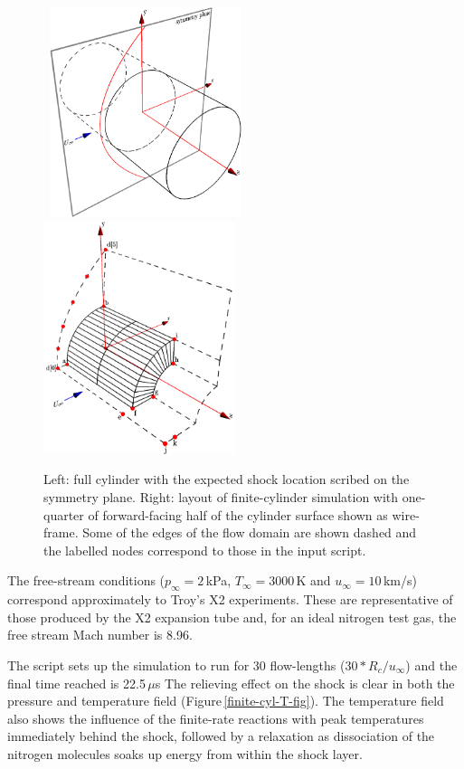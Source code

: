 \begin{figure}[htbp]
\hbox{
  \includegraphics[width=0.5\textwidth]{../3D/finite-cylinder/full-cyl-schematic.pdf}
  \includegraphics[width=0.5\textwidth]{../3D/finite-cylinder/cyl-schematic.pdf}
}
\caption{Left: full cylinder with the expected shock location scribed on the symmetry plane.
   Right: layout of finite-cylinder simulation with one-quarter of forward-facing half 
   of the cylinder surface shown as wire-frame.
   Some of the edges of the flow domain are shown dashed and
   the labelled nodes correspond to those in the input script.}
\label{finite-cyl-layout}
\end{figure}

\medskip 
The free-stream conditions ($p_{\infty} = 2$\,kPa, $T_{\infty} = 3000$\,K
and $u_{\infty} = 10$\,km/s) correspond approximately to Troy's X2 experiments.
These are representative of those produced by the X2 expansion tube and,
for an ideal nitrogen test gas, the free stream Mach number is 8.96.

\medskip
The script sets up the simulation to run for 30 flow-lengths ($30 * R_c / u_{\infty}$)
and the final time reached is 22.5\,$\mu$s
The relieving effect on the shock is clear in both the pressure and temperature field (Figure\,\ref{finite-cyl-T-fig}).
The temperature field also shows the influence of the finite-rate reactions with peak temperatures immediately
behind the shock, followed by a relaxation as dissociation of the nitrogen molecules soaks up energy from within the 
shock layer.
 
